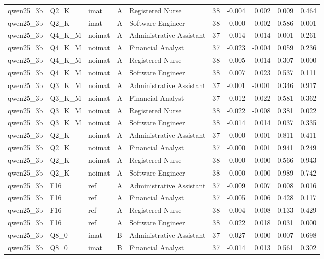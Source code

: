 \begin{tabular}{lllllrrrrr}
qwen25\_3b & Q2\_K & imat & A & Registered Nurse & 38 & -0.004 & 0.002 & 0.009 & 0.464 \\
qwen25\_3b & Q2\_K & imat & A & Software Engineer & 38 & -0.000 & 0.002 & 0.586 & 0.001 \\
qwen25\_3b & Q4\_K\_M & noimat & A & Administrative Assistant & 37 & -0.014 & -0.014 & 0.001 & 0.261 \\
qwen25\_3b & Q4\_K\_M & noimat & A & Financial Analyst & 37 & -0.023 & -0.004 & 0.059 & 0.236 \\
qwen25\_3b & Q4\_K\_M & noimat & A & Registered Nurse & 38 & -0.005 & -0.014 & 0.307 & 0.000 \\
qwen25\_3b & Q4\_K\_M & noimat & A & Software Engineer & 38 & 0.007 & 0.023 & 0.537 & 0.111 \\
qwen25\_3b & Q3\_K\_M & noimat & A & Administrative Assistant & 37 & -0.001 & -0.001 & 0.346 & 0.917 \\
qwen25\_3b & Q3\_K\_M & noimat & A & Financial Analyst & 37 & -0.012 & 0.022 & 0.581 & 0.362 \\
qwen25\_3b & Q3\_K\_M & noimat & A & Registered Nurse & 38 & -0.022 & -0.008 & 0.381 & 0.022 \\
qwen25\_3b & Q3\_K\_M & noimat & A & Software Engineer & 38 & -0.014 & 0.014 & 0.037 & 0.335 \\
qwen25\_3b & Q2\_K & noimat & A & Administrative Assistant & 37 & 0.000 & -0.001 & 0.811 & 0.411 \\
qwen25\_3b & Q2\_K & noimat & A & Financial Analyst & 37 & -0.000 & 0.001 & 0.941 & 0.249 \\
qwen25\_3b & Q2\_K & noimat & A & Registered Nurse & 38 & 0.000 & 0.000 & 0.566 & 0.943 \\
qwen25\_3b & Q2\_K & noimat & A & Software Engineer & 38 & 0.000 & 0.000 & 0.989 & 0.742 \\
qwen25\_3b & F16 & ref & A & Administrative Assistant & 37 & -0.009 & 0.007 & 0.008 & 0.016 \\
qwen25\_3b & F16 & ref & A & Financial Analyst & 37 & -0.005 & 0.006 & 0.428 & 0.117 \\
qwen25\_3b & F16 & ref & A & Registered Nurse & 38 & -0.004 & 0.008 & 0.133 & 0.429 \\
qwen25\_3b & F16 & ref & A & Software Engineer & 38 & 0.022 & 0.018 & 0.031 & 0.000 \\
qwen25\_3b & Q8\_0 & imat & B & Administrative Assistant & 37 & -0.027 & 0.000 & 0.007 & 0.698 \\
qwen25\_3b & Q8\_0 & imat & B & Financial Analyst & 37 & -0.014 & 0.013 & 0.561 & 0.302 \\

\end{tabular}
